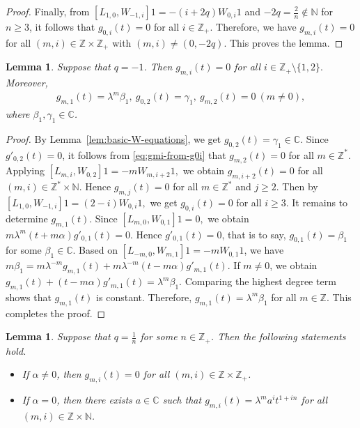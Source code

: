 \documentclass[a4paper]{amsart}
\numberwithin{equation}{section}
\newtheorem{lemma}[theorem]{Lemma}
\begin{document}
\begin{proof}
Finally, from
$[L_{1,0},W_{-1,i}]1=-(i+2q)W_{0,i}1$
and $-2q=\frac2n\notin\mathbb N$ for $n\geq3$, it follows that
$g_{0,i}(t)=0$
for all $i\in\mathbb Z_{+}$. Therefore, we have $g_{m,i}(t)=0$ for all $(m,i)\in\mathbb Z\times\mathbb Z_{+}$ with $(m,i)\neq(0,-2q)$.
This proves the  lemma.
\end{proof}




\begin{lemma}\label{lem:q-minus-one-W-vanishing}
Suppose that $q=-1$. Then
$
g_{m,i}(t)=0
$
for all $i\in\mathbb Z_+\setminus\{1,2\}.$  Moreover,
\begin{align*}
g_{m,1}(t)=\lambda^m\beta_1, \
g_{0,2}(t)=\gamma_1, \
g_{m,2}(t)=0 \ (m\neq0),
\end{align*}
where $\beta_1,\gamma_1\in\mathbb C$.
\end{lemma}
\begin{proof}
By Lemma~\ref{lem:basic-W-equations}, we get
$g_{0,2}(t)=\gamma_1\in\mathbb C.$
Since $g'_{0,2}(t)=0$, it follows
from \eqref{eq:gmi-from-g0i} that
$g_{m,2}(t)=0$
for all $m\in\mathbb Z^*$.
Applying
$
[L_{m,i},W_{0,2}]1=-mW_{m,i+2}1,
$
we obtain
$g_{m,i+2}(t)=0$
for all $(m,i)\in\mathbb Z^*\times\mathbb N$. Hence
$g_{m,j}(t)=0$
for all $m\in\mathbb Z^*$ and $j\geq2$.
Then  by
$[L_{1,0},W_{-1,i}]1=(2-i)W_{0,i}1,$
we get
$g_{0,i}(t)=0$
for all $i\ge3$.
It remains to determine $g_{m,1}(t)$. Since
$
[L_{m,0},W_{0,1}]1=0,
$  we obtain
$
m\lambda^m(t+m\alpha)g'_{0,1}(t)=0.
$
Hence $g'_{0,1}(t)=0$,  that is to say,  
$g_{0,1}(t)=\beta_1$
for some $\beta_1\in\mathbb C$.
Based on 
$[L_{-m,0},W_{m,1}]1=-mW_{0,1}1$, we have
$ 
m\beta_1
=
m\lambda^{-m}g_{m,1}(t)
+
m\lambda^{-m}(t-m\alpha)g'_{m,1}(t).
$ 
If $m\neq 0$, we obtain
$
g_{m,1}(t)+(t-m\alpha)g'_{m,1}(t)=\lambda^m\beta_1.
$
Comparing the highest degree term
shows that $g_{m,1}(t)$ is constant. Therefore,
$
g_{m,1}(t)=\lambda^m\beta_1$ for all $m\in\mathbb{Z}$.
This completes the proof.
\end{proof}
\begin{lemma}\label{lem:positive-reciprocal-W-action}
Suppose that $q=\frac1n$ for some
$n\in\mathbb Z_+$. Then the following statements hold.

\begin{itemize}
\item If $\alpha\neq0$, then
$
g_{m,i}(t)=0
$
for all $(m,i)\in\mathbb Z\times\mathbb Z_+$.

\item If $\alpha=0$, then there exists $a\in\mathbb C$ such that
$
g_{m,i}(t)=\lambda^m a^i t^{1+in}
$
for all $(m,i)\in\mathbb Z\times\mathbb N$.
\end{itemize}
\end{lemma}
\end{document}
